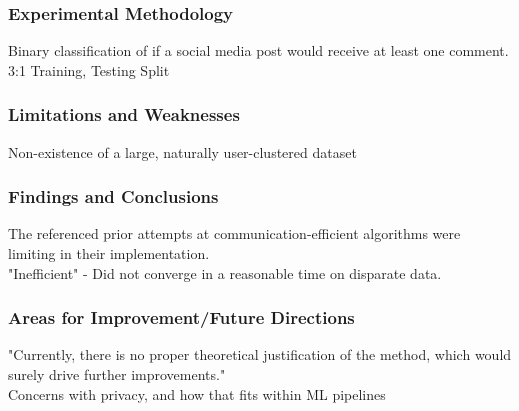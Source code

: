 \documentclass{beamer}
\begin{document}
\begin{frame}
	\frametitle{Experimental Methodology}
	Binary classification of if a social media post would receive at least one comment. \\
	3:1 Training, Testing Split
\end{frame}

\begin{frame}
	\frametitle{Limitations and Weaknesses}
	Non-existence of a large, naturally user-clustered dataset
\end{frame}

\begin{frame}
	\frametitle{Findings and Conclusions}
	The referenced prior attempts at communication-efficient algorithms were limiting in their implementation.\\
	"Inefficient" - Did not converge in a reasonable time on disparate data.
\end{frame}

\begin{frame}
	\frametitle{Areas for Improvement/Future Directions}
	"Currently, there is no proper theoretical justification of the method, which would surely drive further improvements."\\
	Concerns with privacy, and how that fits within ML pipelines
\end{frame}
\end{document}

